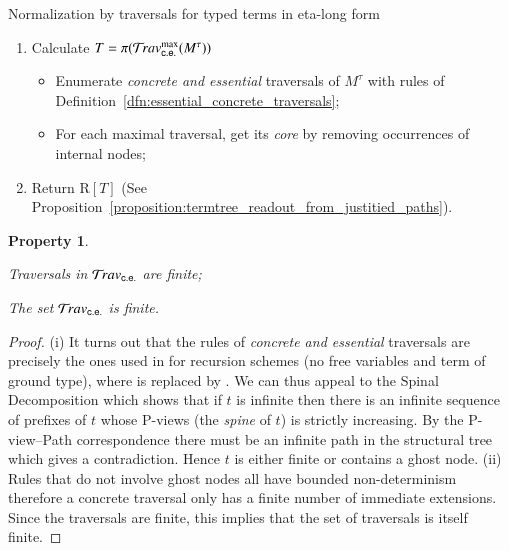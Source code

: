 \documentclass{elsarticle}
\theoremstyle{plain}
\newtheorem{property}[theorem]{Property}
\theoremstyle{definition}
\newcommand{\concreteessential}{{\sf c.e.}}
\newcommand{\travsetcones}{\travset_\concreteessential} %
\def\readout{\mathrm{R}} %
\def\coresymbol{\pi} %
\newcommand{\core}[1]{\coresymbol(#1)} %
\begin{document}
\begin{algorithm}[!ht]
\caption{Normalization by traversals for typed terms in eta-long form}
\label{algo:stlc_normalization_by_traversals}
\begin{algorithmic}
\begin{enumerate}[nosep]
  \item Calculate $T = \core{\travsetcones^{\max}(M^\tau)}$
  \begin{itemize}[nosep]
    \item Enumerate \emph{concrete and essential} traversals of $M^\tau$ with rules of Definition~\ref{dfn:essential_concrete_traversals};
    \item For each maximal traversal, get its \emph{core} by removing occurrences of internal nodes;
  \end{itemize}
  \item Return $\readout[T]$ (See Proposition~\ref{proposition:termtree_readout_from_justitied_paths}).
\end{enumerate}
\end{algorithmic}
\end{algorithm}

\begin{property}
    \label{prop:concrete_essential_trav_finite}
    \begin{enumerate*}
        \item[(i)] Traversals in $\travsetcones$ are finite;
        \item[(ii)] The set $\travsetcones$ is finite.
    \end{enumerate*}
    \end{property}
    \begin{proof}
    (i) It turns out that the rules of \emph{concrete and essential} traversals are precisely the ones used in \cite{OngLics2006} for recursion schemes (no free variables and term of ground type), where  is replaced by . We can thus appeal to the Spinal Decomposition
    \cite[Lemma 8]{OngLics2006} which shows that if $t$ is infinite then there is an infinite sequence of prefixes of $t$ whose P-views (the \emph{spine} of $t$) is strictly increasing. By the P-view--Path correspondence there must be an infinite path in the structural tree which gives a contradiction. Hence $t$ is either finite or contains a ghost node.
    (ii) Rules that do not involve ghost nodes all have bounded non-determinism therefore a concrete traversal only has a finite number of immediate extensions. Since the traversals are finite, this implies that the set of traversals is itself finite.
\end{proof}
\end{document}
